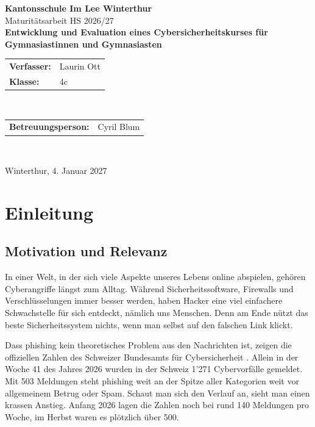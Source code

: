 \documentclass[12pt,a4paper]{article}
\begin{document}
\begin{center}
    {\Large \textbf{Kantonsschule Im Lee Winterthur}}\\[0.4cm]
    {\large Maturitätsarbeit HS 2026/27}\\[2.5cm]

    {\large \textbf{Entwicklung und Evaluation eines Cybersicherheitskurses für Gymnasiastinnen und Gymnasiasten}}\\[3.5cm]

    \begin{tabular}{ll}
        \textbf{Verfasser:} & Laurin Ott \\
        \textbf{Klasse:} & 4c
    \end{tabular}\\[2.5cm]

    \begin{tabular}{ll}
        \textbf{Betreuungsperson:} & Cyril Blum %
    \end{tabular}\\[3cm]

    \vfill

    {\large Winterthur, 4. Januar 2027}
\end{center}

\newpage
{} %
\tableofcontents
\thispagestyle{empty}

\newpage
{} %
\setcounter{page}{1}

\section{Einleitung}
\label{sec:einleitung}

\subsection{Motivation und Relevanz}
In einer Welt, in der sich viele Aspekte unseres Lebens online abspielen, gehören Cyberangriffe längst zum Alltag. Während Sicherheitssoftware, Firewalls und Verschlüsselungen immer besser werden, haben Hacker eine viel einfachere Schwachstelle für sich entdeckt, nämlich uns Menschen. Denn am Ende nützt das beste Sicherheitssystem nichts, wenn man selbst auf den falschen Link klickt.

Dass \gls{phishing} kein theoretisches Problem aus den Nachrichten ist, zeigen die offiziellen Zahlen des Schweizer Bundesamts für Cybersicherheit \cite{bacs2026statistik}. Allein in der Woche 41 des Jahres 2026 wurden in der Schweiz 1'271 Cybervorfälle gemeldet\cite{bacs2026statistik}. Mit 503 Meldungen steht \gls{phishing} weit an der Spitze aller Kategorien weit vor allgemeinem Betrug oder Spam\cite{bacs2026statistik}. Schaut man sich den Verlauf an, sieht man einen krassen Anstieg. Anfang 2026 lagen die Zahlen noch bei rund 140 Meldungen pro Woche, im Herbst waren es plötzlich über 500\cite{bacs2026statistik}. 
\end{document}

